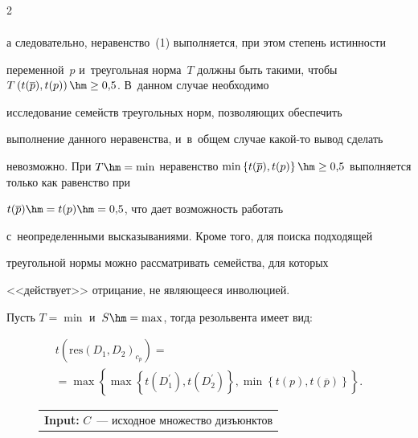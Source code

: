 \begin{multicols}{2}
\begin{multline*}
  \end{multline*}


а следовательно, неравенство~(1) выполняется, при этом степень истинности 


переменной~$p$ и~треугольная норма~$T$ должны быть такими, чтобы\linebreak $T\left( 


t(\overline{p}), t(p)\right) \hm\geq 0{,}5$. В~данном случае необходимо 


исследование семейств треугольных норм, поз\-во\-ля\-ющих обеспечить 


выполнение данного неравенства, и~в~общем случае ка\-кой-то вывод \mbox{сделать} 


невозможно. При $T\hm=\min$ неравенство $\min \left\{ t(\overline{p}), 


t(p)\right\} \hm\geq 0{,}5$ выполняется только как равенство при 


$t(\overline{p})\hm= t(p)\hm=0{,}5$, что дает воз\-мож\-ность работать 


с~неопределенными высказываниями. Кроме того, для поиска подходящей 


\mbox{треугольной} нормы можно рассматривать семейства, для которых 


<<действует>> отрицание, не являющееся инволюцией.





  Пусть $T=\min$ и~$S\hm=\max$, тогда резольвента имеет вид:


  \begin{multline*}


  t\left( \mathrm{res}\left(D_1, D_2\right)_{c_p}\right) ={}\\


  {}= \max \left\{ \max \left\{ t(D_1^\prime), 


t(D_2^\prime)\right\}, \min \left\{ t(p), t(\overline{p})\right\}\right\}.


\end{multline*}





\begin{figure}[b] %


\begin{center}


{\small \begin{tabular}{|p{118mm}|}


  \hline


   \textbf{Input:} $C$~--- исходное множество дизъюнктов\\



\end{tabular}}
\end{center}
\end{figure}
\end{multicols}
